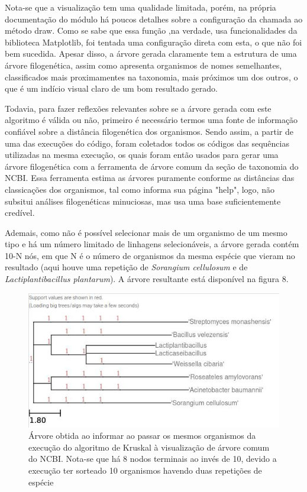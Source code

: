\documentclass[brazilian,12pt,a4paper,final]{article}
\begin{document}
	 Nota-se que a visualização tem uma qualidade limitada, porém, na própria documentação do módulo há poucos detalhes sobre a configuração da chamada ao método draw. Como se sabe que essa função ,na verdade, usa funcionalidades da biblioteca Matplotlib, foi tentada uma configuração direta com esta, o que não foi bem sucedida. Apesar disso, a árvore gerada claramente tem a estrutura de uma árvore filogenética, assim como apresenta organismos de nomes semelhantes, classificados mais proximamentes na taxonomia, mais próximos um dos outros, o que é um indício visual claro de um bom resultado gerado.
	\vspace{0.5cm}
	 
	 
	 Todavia, para fazer reflexões relevantes sobre se a árvore gerada com este algoritmo é válida ou não, primeiro é necessário termos uma fonte de informação confiável sobre a distância filogenética dos organismos. Sendo assim, a partir de uma das execuções do código, foram coletados todos os códigos das sequências utilizadas na mesma execução, os quais foram então usados para gerar uma árvore filogenética com a ferramenta de árvore comum da seção de taxonomia do NCBI. Essa ferramenta estima as árvores puramente conforme as distâncias das classicações dos organismos, tal como informa sua página "help", logo, não subsitui análises filogenéticas minuciosas, mas usa uma base suficientemente credível.
	 \vspace{0.5cm}
	 
	  Ademais, como não é possível selecionar mais de um organismo de um mesmo tipo e há um número limitado de linhagens selecionáveis, a árvore gerada contém 10-N nós, em que N é o número de organismos da mesma espécie que vieram no resultado (aqui houve uma repetição de \textit{Sorangium cellulosum} e de \textit{Lactiplantibacillus plantarum}). A árvore resultante está disponível na figura 8.
	  
	  \begin{figure}[hbtp]
	  	\begin{center}
	  		\includegraphics[]{Árvore NCBI.jpeg}
	  		\caption{Árvore obtida ao informar ao passar os mesmos organismos da execução do algoritmo de Kruskal à visualização de árvore comum do NCBI. Nota-se que há 8 nodos terminais ao invés de 10, devido a execução ter sorteado 10 organismos havendo duas repetições de espécie}
	  		\label{fig}
	  	\end{center}
	  \end{figure}
	 
\end{document}
